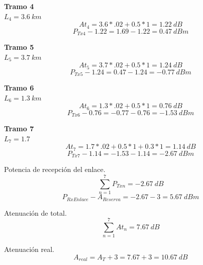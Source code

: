 \documentclass[12pt,letterpaper]{article}
\begin{document}
\textbf{Tramo 4} \\
$L_4=3.6 \ km$
\\ 
\begin{equation}
    At_4=3.6*.02+0.5*1=1.22 \ dB
\end{equation}
\begin{equation}
    P_{Tx4}-1.22=1.69-1.22=0.47 \ dBm
\end{equation}

\textbf{Tramo 5} \\
$L_5=3.7 \ km$
\\
\begin{equation}
    At_5=3.7*.02+0.5*1=1.24 \ dB
\end{equation}
\begin{equation}
    P_{Tx5}-1.24=0.47-1.24=-0.77 \ dBm
\end{equation}

\textbf{Tramo 6} \\
$L_6=1.3 \ km$
\\
\begin{equation}
    At_6=1.3*.02+0.5*1=0.76 \ dB
\end{equation}
\begin{equation}
    P_{Tx6}-0.76=-0.77-0.76=-1.53 \ dBm
\end{equation}

\textbf{Tramo 7} \\
$L_7=1.7$
\\ 
\begin{equation}
    At_7=1.7*.02+0.5*1+0.3*1=1.14 \ dB
\end{equation}
\begin{equation}
    P_{Tx7}-1.14=-1.53-1.14=-2.67 \ dBm
\end{equation}

Potencia de recepción del enlace.
\begin{equation}
    \sum_{n=1}^{7} P_{Txn} = -2.67 \ dB
\end{equation}
\begin{equation}
    P_{RxEnlace}-A_{Reserva}=-2.67-3=5.67 \ dBm
\end{equation}

Atenuación de total.
\begin{equation}
    \sum_{n=1}^{7} At_n = 7.67 \ dB
\end{equation}

Atenuación real.
\begin{equation}
    A_{real}=A_T+3=7.67+3=10.67 \ dB
\end{equation}
\end{document}
